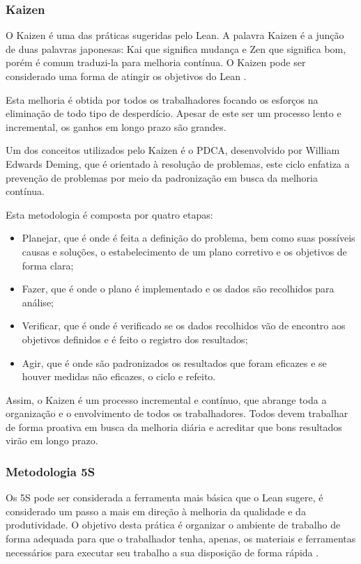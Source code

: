 \subsubsection[Kaizen]{Kaizen}

O Kaizen é uma das práticas sugeridas pelo Lean. A palavra Kaizen é a junção de duas palavras japonesas: Kai que significa mudança e Zen que significa bom, porém é comum traduzi-la para melhoria contínua. O Kaizen  pode ser considerado uma forma de atingir os objetivos do Lean \cite{bell2011}.

Esta melhoria é obtida por todos os trabalhadores focando os esforços na eliminação de todo tipo de desperdício. Apesar de este ser um processo lento e incremental, os ganhos em longo prazo são grandes.

Um dos conceitos utilizados pelo Kaizen é o PDCA, desenvolvido por William Edwards Deming, que é orientado à resolução de problemas, este ciclo enfatiza a prevenção de problemas por meio da padronização em busca da melhoria contínua. 

Esta metodologia é composta por quatro etapas:
\begin{itemize}
\item Planejar, que é onde é feita a definição do problema, bem como suas possíveis causas e soluções, o estabelecimento de um plano corretivo e os objetivos de forma clara;
\item Fazer, que é onde o plano é implementado e os dados são recolhidos para análise;
\item Verificar, que é onde é verificado se os dados recolhidos vão de encontro aos objetivos definidos e é feito o registro dos resultados;
\item Agir, que é onde são padronizados os resultados que foram eficazes e se houver medidas não eficazes, o ciclo e refeito.
\end{itemize}

Assim, o Kaizen é um processo incremental e contínuo, que abrange toda a organização e o envolvimento de todos os trabalhadores. Todos devem trabalhar de forma proativa em busca da melhoria diária e acreditar que bons resultados virão em longo prazo.

\subsubsection[Metodologia 5S]{Metodologia 5S}

Os 5S pode ser considerada a ferramenta mais básica que o Lean sugere, é considerado um passo a mais em direção à melhoria da qualidade e da produtividade. O objetivo desta prática é organizar o ambiente de trabalho de forma adequada para que o trabalhador tenha, apenas, os materiais e ferramentas necessários para executar seu trabalho a sua disposição de forma rápida \cite{bell2011}. 

